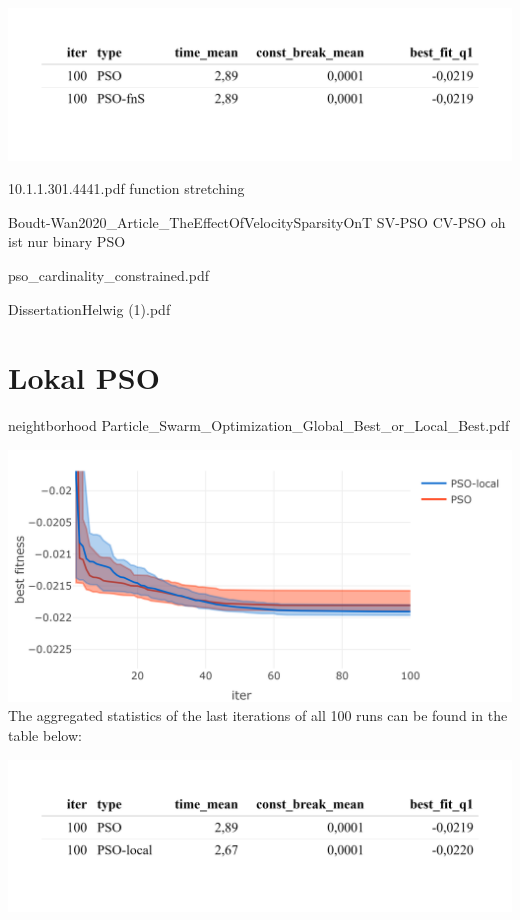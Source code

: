 \documentclass[
  oneside]{book}
\begin{document}
\includegraphics{Master_Thesis_files/figure-latex/unnamed-chunk-11-1.png}

10.1.1.301.4441.pdf
function stretching

Boudt-Wan2020\_Article\_TheEffectOfVelocitySparsityOnT
SV-PSO CV-PSO
oh ist nur binary PSO

pso\_cardinality\_constrained.pdf

DissertationHelwig (1).pdf

\hypertarget{lokal-pso}{%
\section{Lokal PSO}\label{lokal-pso}}

neightborhood
Particle\_Swarm\_Optimization\_Global\_Best\_or\_Local\_Best.pdf

\includegraphics{Master_Thesis_files/figure-latex/unnamed-chunk-12-1.png}
The aggregated statistics of the last iterations of all 100 runs can be found in the table below:

\includegraphics{Master_Thesis_files/figure-latex/unnamed-chunk-13-1.png}
\end{document}
